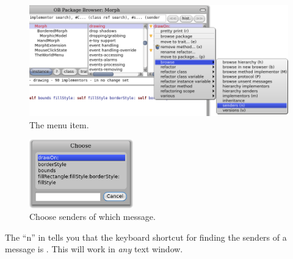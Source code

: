 \documentclass[a4paper,10pt,twoside]{book}
\begin{document}
\begin{figure}[htb]
\centerline {\includegraphics[width=\textwidth]{SendersOfDrawOn}}
\caption{The  menu item.}
\end{figure}

\begin{figure}[htb]
\centerline {\includegraphics[width=0.4\textwidth]{SendersOfDrawOn2}}
\caption{Choose senders of which message.}
\end{figure}

The ``n'' in  tells you that the keyboard shortcut for finding the senders of a message is . This will work in \emph{any} text window.

\end{document}
